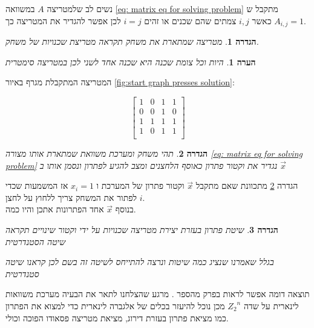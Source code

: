 \documentclass[12pt,leqno]{article}
\newtheorem{definition}{הגדרה}[section]
\newtheorem{comm}{הערה}[section]
\newcommand{\Zn}{{Z_2}^n}
\begin{document}
נשים לב שלמטריצה
$A$
במשוואה
\ref{eq: matrix eq for solving problem}
מתקבל ש
$A_{i,j} = 1$
כאשר 
$i, j$
צמתים שהם שכנים או זהים
$i = j$
לכן אפשר להגדיר את המטריצה כך.

\begin{definition}
    \label{def: neighbor matrix}
    מטריצה שמתארת את משחק תקראה מטריצת שכנויות של משחק.
\end{definition}


\begin{comm}
    \label{comm: symetic matrix}
    היות וכל צומת שכנה היא שכנה אחד לשני לכן במטריצה
    סימטרית
\end{comm}

המטריצה  המתקבלת מגרף באיור 
\ref{fig:start graph presses solution}:

\[
    \begin{bmatrix}
        1 & 0 & 1 & 1\\
        0 & 0 & 1 & 0\\
        1 & 1 & 1 & 1\\
        1 & 0 & 1 & 1\\
    \end{bmatrix}
\]


\begin{definition}
    \label{ def: solution vector}
    תהי משחק ומערכת משוואת שמתארת אותו מצורה 
    \ref{eq: matrix eq for solving problem} 
    נגדיר את וקטור פתרון כאוסף הלחצנים ומצב להגיע לפתרון
    ונסמן אותו ב
    $\vec{x}$
\end{definition}

הגדרה 
\ref{ def: solution vector}
מתכוונת שאם מתקבל
$\vec{x}$
וקטור פתרון של המערכת 
ו
$x_i = 1$
אז המשמעות שכדי לפתור את המשחק
צריך ללחוץ על לחצן 
$i$.
\\
בנוסף 
$\vec{x}$
אחד הפתרונות אתכן והיו כמה.

\begin{definition}
    \label{def: standard solution}
    שיטת פתרון בעזרת יצירת  מטריצה שכנויות על ידי וקטור שינויים תקראה
    \\
    שיטה הסטנדרטית

    בגלל שאמרנו שנציג כמה שיטות ונרצה להתייחס לשיטה זה בשם לכן קראנו שיטה סטנדרטית
\end{definition}

תוצאה דומה אפשר לראות בפרק מהספר
\cite{B2}.
מרגע שהצלחנו לתאר את הבעיה מערכת משוואות לינארית
על שדה
$\Zn$
מכן נוכל להיעזר בכלים של אלגברה לינארית כדי למצוא את הפתרון כמו מציאת פתרון בעזרת דירוג,
מציאת מטריצה פסאודו הפוכה וכולי. 
\end{document}

